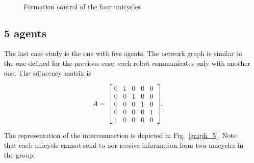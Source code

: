 \documentclass[11pt]{article}
\begin{document}
\begin{figure}[H]
\centering
{} \quad
{} \\
\caption{Formation control of the four unicycles}
\label{results_formation_4}
\end{figure} 

\subsection*{5 agents}

The last case study is the one with five agents. The network graph is similar to the one defined for the previous case: each robot communicates only with another one. The adjacency matrix is

\[
A =
\begin{bmatrix}
0 & 1 & 0 & 0 & 0 \\
0 & 0 & 1 & 0 & 0 \\
0 & 0 & 0 & 1 & 0 \\
0 & 0 & 0 & 0 & 1 \\
1 & 0 & 0 & 0 & 0 
\end{bmatrix}.
\]
 
The representation of the interconnection is depicted in Fig.~\ref{graph_5}. Note that each unicycle cannot send to nor receive information from two unicycles in the group.
\end{document}
